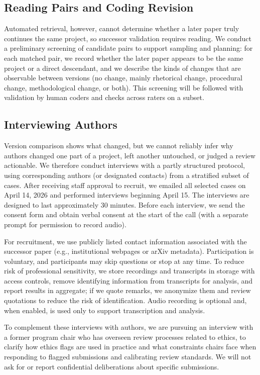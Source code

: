 \documentclass[sigconf,nonacm]{acmart} %
\begin{document}
\subsection{Reading Pairs and Coding Revision}

Automated retrieval, however, cannot determine whether a later paper truly continues the same project, so successor validation requires reading. We conduct a preliminary screening of candidate pairs to support sampling and planning: for each matched pair, we record whether the later paper appears to be the same project or a direct descendant, and we describe the kinds of changes that are observable between versions (no change, mainly rhetorical change, procedural change, methodological change, or both). This screening will be followed with validation by human coders and checks across raters on a subset.

\subsection{Interviewing Authors}

Version comparison shows what changed, but we cannot reliably infer why authors changed one part of a project, left another untouched, or judged a review actionable. We therefore conduct interviews with a partly structured protocol, using corresponding authors (or designated contacts) from a stratified subset of cases. After receiving staff approval to recruit, we emailed all selected cases on April 14, 2026 and performed interviews beginning April 15. The interviews are designed to last approximately 30 minutes. Before each interview, we send the consent form and obtain verbal consent at the start of the call (with a separate prompt for permission to record audio).

For recruitment, we use publicly listed contact information associated with the successor paper (e.g., institutional webpages or arXiv metadata). Participation is voluntary, and participants may skip questions or stop at any time. To reduce risk of professional sensitivity, we store recordings and transcripts in storage with access controls, remove identifying information from transcripts for analysis, and report results in aggregate; if we quote remarks, we anonymize them and review quotations to reduce the risk of identification. Audio recording is optional and, when enabled, is used only to support transcription and analysis.

To complement these interviews with authors, we are pursuing an interview with a former program chair who has overseen review processes related to ethics, to clarify how ethics flags are used in practice and what constraints chairs face when responding to flagged submissions and calibrating review standards. We will not ask for or report confidential deliberations about specific submissions.
\end{document}
